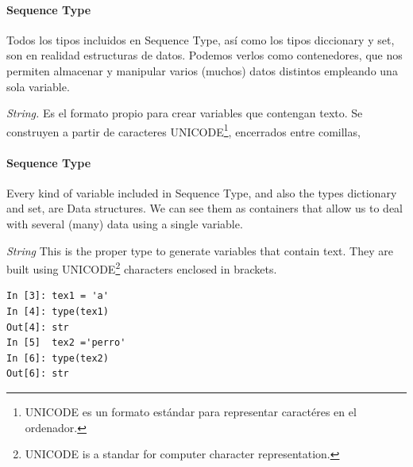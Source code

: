 \begin{paracol}{2}
\paragraph{Sequence Type}
    Todos los tipos incluidos en Sequence Type, así como los tipos diccionary y set, son en realidad estructuras de datos. Podemos verlos como contenedores, que nos permiten almacenar y manipular varios (muchos) datos distintos empleando una sola variable.
         
         \emph{String.} Es el formato propio para crear variables que contengan texto. Se construyen a partir de caracteres UNICODE\footnote{UNICODE es un formato estándar para representar caractéres en el ordenador.}, encerrados entre comillas,

\switchcolumn
\paragraph{Sequence Type} Every kind of variable included in Sequence Type, and also the types dictionary and set, are Data structures. We can see them as containers that allow us to deal with several (many) data using a single variable.

\emph{String} This is the proper type to generate variables that contain text. They are built using UNICODE\footnote{UNICODE is a standar for computer character representation.} characters enclosed in brackets.

\end{paracol}
\begin{center}
\begin{minipage}{0.2\textwidth}
\begin{verbatim}
In [3]: tex1 = 'a'
In [4]: type(tex1)
Out[4]: str
In [5]  tex2 ='perro'
In [6]: type(tex2)
Out[6]: str
\end{verbatim}
\end{minipage}
\end{center}

